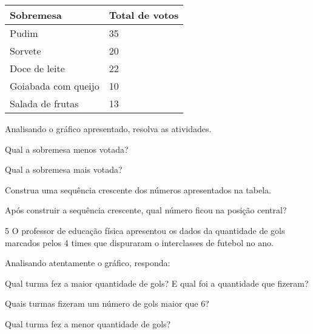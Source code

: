 {\begin{longtable}[]{@{}ll@{}}
\toprule
Sobremesa & Total de votos\tabularnewline
\midrule
\endhead
Pudim & 35\tabularnewline
Sorvete & 20\tabularnewline
Doce de leite & 22\tabularnewline
Goiabada com queijo & 10\tabularnewline
Salada de frutas & 13\tabularnewline
\bottomrule
\end{longtable}

Analisando o gráfico apresentado, resolva as atividades.

\begin{escolha}
\item
  Qual a sobremesa menos votada?


\item
  Qual a sobremesa mais votada?


\item
  Construa uma sequência crescente dos números apresentados na tabela.


\item
  Após construir a sequência crescente, qual número ficou na posição
  central?

\end{escolha}


\num{5} O professor de educação física apresentou os dados da quantidade de
gols marcados pelos 4 times que dispuraram o interclasses de futebol no
ano.


Analisando atentamente o gráfico, responda:

\begin{escolha}
\item
  Qual turma fez a maior quantidade de gols? E qual foi a quantidade que
  fizeram?


\item
  Quais turmas fizeram um número de gols maior que 6?


\item
  Qual turma fez a menor quantidade de gols?


\end{escolha}}
